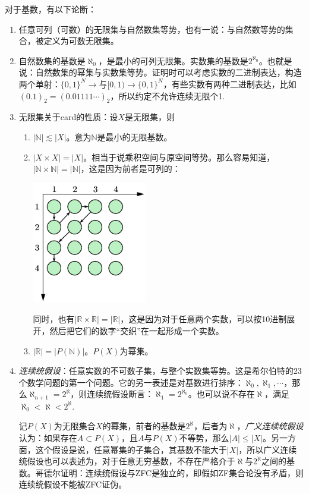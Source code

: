 对于基数，有以下论断：
\begin{enumerate}
\item 任意可列（可数）的无限集与自然数集等势，也有一说：与自然数等势的集合，被定义为可数无限集。
\item 自然数集的基数是$\aleph_0$，是最小的可列无限集。实数集的基数是$2^{\aleph_0}$。也就是说：自然数集的幂集与实数集等势。证明时可以考虑实数的二进制表达，构造两个单射：$\{0,1\}^N\rightarrow $与$[0,1)\rightarrow \{0,1\}^N$，有些实数有两种二进制表达，比如$(0.1)_{2}=(0.01111\cdots)_2$，所以约定不允许连续无限个1.
\item 无限集关于card的性质：设$X$是无限集，则
\begin{enumerate}
\item $|\mathbb{N}| \lesssim |X|$。意为$\mathbb{N}$是最小的无限基数。
\item $|X\times X|=|X|$。相当于说乘积空间与原空间等势。那么容易知道，$|\mathbb{N}\times \mathbb{N}|=|\mathbb{N}|$，这是因为前者是可列的：
\begin{center}
\includegraphics[width=5cm]{figure/2d-list.png}
\end{center}
同时，也有$|\mathbb{R}\times \mathbb{R}|=|\mathbb{R}|$，这是因为对于任意两个实数，可以按10进制展开，然后把它们的数字“交织”在一起形成一个实数。
\item $|\mathbb{R}|=|P(\mathbb{N})|$。$P(X)$为幂集。
\end{enumerate}
\item \emph{连续统假设}：任意实数的不可数子集，与整个实数集等势。这是希尔伯特的23个数学问题的第一个问题。它的另一表述是对基数进行排序：$\aleph_0,\aleph_1,\cdots$，那么$\aleph_{n+1}=2^{\aleph}$，则连续统假设断言：$\aleph_1=2^{\aleph_0}$。也可以说不存在$\aleph$，满足$\aleph_0<\aleph<2^{\aleph}$.

记$P(X)$为无限集合$X$的幂集，前者的基数是$2^{\aleph}$，后者为$\aleph$，\emph{广义连续统假设}认为：如果存在$A\subset P(X)$，且$A$与$P(X)$不等势，那么$|A|\leq |X|$。另一方面，这个假设是说，任意幂集的子集合，其基数不能大于$|X|$，所以广义连续统假设也可以表述为，对于任意无穷基数，不存在严格介于$\aleph$与$2^{\aleph}$之间的基数。哥德尔证明：连续统假设与ZFC是独立的，即假如ZF集合论没有矛盾，则连续统假设不能被ZFC证伪。
\end{enumerate}

